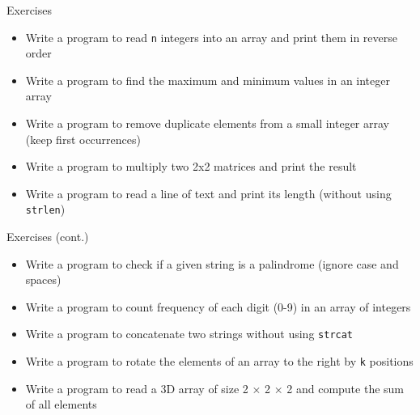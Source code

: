\documentclass[12pt, aspectratio=169]{beamer}
\begin{document}
    \begin{frame}{Exercises}
        \begin{itemize}
            \item Write a program to read \texttt{n} integers into an array and print them in reverse order
            \item Write a program to find the maximum and minimum values in an integer array
            \item Write a program to remove duplicate elements from a small integer array (keep first occurrences)
            \item Write a program to multiply two 2x2 matrices and print the result
            \item Write a program to read a line of text and print its length (without using \texttt{strlen})
        \end{itemize}
    \end{frame}


    \begin{frame}{Exercises (cont.)}
        \begin{itemize}
            \item Write a program to check if a given string is a palindrome (ignore case and spaces)
            \item Write a program to count frequency of each digit (0-9) in an array of integers
            \item Write a program to concatenate two strings without using \texttt{strcat}
            \item Write a program to rotate the elements of an array to the right by \texttt{k} positions
            \item Write a program to read a 3D array of size 2 × 2 × 2 and compute the sum of all elements
        \end{itemize}
    \end{frame}
\end{document}
